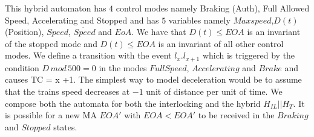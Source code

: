 This hybrid automaton has $4$ control modes namely Braking (Auth), Full Allowed Speed, Accelerating and Stopped and has $5$ variables namely $Maxspeed$,$D(t)$ (Position),  $Speed$, $\dot{Speed}$ and $EoA$. We have that $D(t) \leq EOA$ is an invariant of the stopped mode and $D(t) \leq EOA$ is an invariant of all other control modes.
We define a transition with the event $l_x.l_{x+1}$ which is triggered by the condition $D \,  mod \, 500 = 0$ in the modes $Full Speed$, $Accelerating$ and $Brake$ and causes TC = x +1. 
The simplest way to model deceleration would be to assume that the trains speed decreases at $-1$ unit of distance per unit of time.   We compose both the automata for both the interlocking and the hybrid $H_{IL} || H_{T}$. It is possible for a new MA $EOA'$ with $EOA < EOA'$ to be received in the $Braking$ and $Stopped$ states. 



\begin{figure} [h!]

\begin{center}
\end{center}

\label{fig:ILAuton}
\end{figure}


